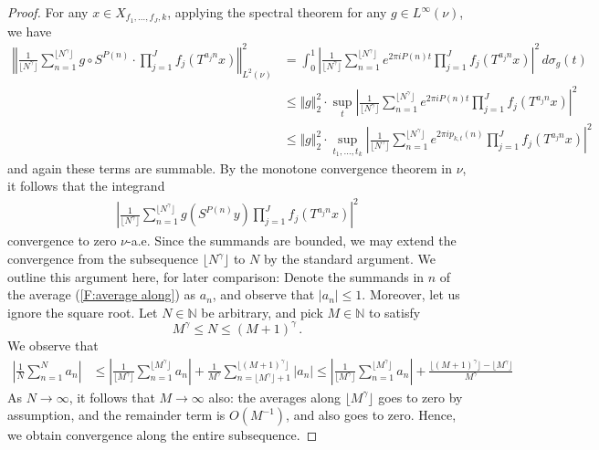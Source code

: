 \documentclass[10pt,a4paper]{amsart}
\newcommand{\floor}[1]{\lfloor#1\rfloor}
\begin{document}
\begin{proof}
For any $x\in X_{f_1, \dots, f_J, k}$, applying the spectral theorem for any $g\in L^\infty(\nu)$, we have
\begin{align*}
\left\Vert \frac{1}{\floor{N^\gamma}} \sum_{n=1}^{\floor{N^\gamma}} g \circ S^{P(n)} \cdot \prod_{j=1}^J f_j (T^{a_j n} x)\right\Vert_{L^2(\nu)}^2 &= \int_0^1 \left| \frac{1}{\floor{N^\gamma}} \sum_{n=1}^{\floor{N^\gamma}} e^{2\pi i P(n) t} \prod_{j=1}^J f_j (T^{a_j n} x) \right|^2 \, d\sigma_g(t)  \\
& \leq \Vert g \Vert_2^2 \cdot \sup_t \left| \frac{1}{\floor{N^\gamma}} \sum_{n=1}^{\floor{N^\gamma}} e^{2\pi i P(n) t} \prod_{j=1}^J f_j (T^{a_j n} x) \right|^2 \\
& \leq \Vert g \Vert_2^2 \cdot \sup_{t_1, \dots, t_{k}} \left| \frac{1}{\floor{N^\gamma}} \sum_{n=1}^{\floor{N^\gamma}} e^{2\pi i p_{k, t}(n)} \prod_{j=1}^J f_j (T^{a_j n} x) \right|^2
\end{align*}
and again these terms are summable. By the monotone convergence theorem in $\nu$, it follows that the integrand
\begin{align}\label{F:average along}
\left|\frac{1}{\floor{N^\gamma}} \sum_{n=1}^{\floor{N^\gamma}} g( S^{P(n)} y) \prod_{j=1}^J f_j (T^{a_j n} x) \right|^2
\end{align}
convergence to zero $\nu$-a.e. Since the summands are bounded, we may extend the convergence from the subsequence $\floor{N^\gamma}$ to $N$ by the standard argument. We outline this argument here, for later comparison: Denote the summands in $n$ of the average (\ref{F:average along}) as $a_n$, and observe that $|a_n| \leq 1$. Moreover, let us ignore the square root. Let $N\in \mathbb{N}$ be arbitrary, and pick $M\in \mathbb{N}$ to satisfy
$$M^\gamma \leq N \leq (M+1)^\gamma \, .$$
We observe that
\begin{align*}
\left| \frac{1}{N}\sum_{n=1}^N a_n\right| &\leq \left|\frac{1}{\floor{M^\gamma}}\sum_{n=1}^{\floor{M^\gamma}} a_n\right| + \frac{1}{M^\gamma} \sum_{n = \floor{M^\gamma}+1}^{\floor{(M + 1)^\gamma}} |a_n| \leq \left|\frac{1}{\floor{M^\gamma}}\sum_{n=1}^{\floor{M^\gamma}} a_n\right| + \frac{\floor{(M + 1)^\gamma}-\floor{M^\gamma}}{M^\gamma} 
\end{align*}
As $N\to \infty$, it follows that $M \to \infty$ also: the averages along $\floor{M^\gamma}$ goes to zero by assumption, and the remainder term is $O(M^{-1})$, and also goes to zero. Hence, we obtain convergence along the entire subsequence.


\end{proof}
\end{document}
